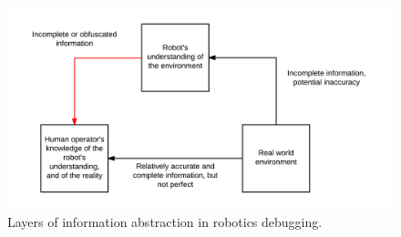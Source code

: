 \begin{figure}
\centering
\includegraphics{Figures/RobotDebuggingInformationAbstraction.png}
\decoRule
\caption[Debugging Information]{Layers of information abstraction in robotics debugging.}
\label{fig:DebuggingInformation}
\end{figure}
